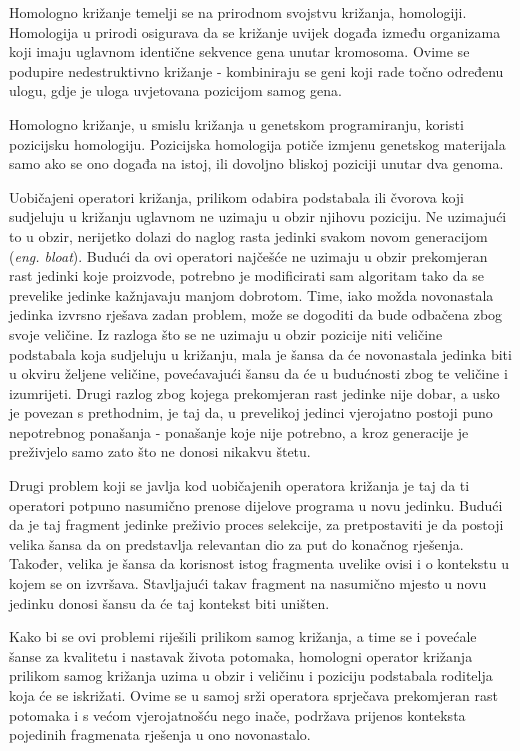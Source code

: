 Homologno križanje \cite{crxSizeFair} temelji se na prirodnom svojstvu križanja, homologiji. Homologija u prirodi osigurava da se križanje uvijek događa između organizama koji imaju uglavnom identične sekvence gena unutar kromosoma. Ovime se podupire nedestruktivno križanje - kombiniraju se geni koji rade točno određenu ulogu, gdje je uloga uvjetovana pozicijom samog gena.

Homologno križanje, u smislu križanja u genetskom programiranju, koristi pozicijsku homologiju. Pozicijska homologija potiče izmjenu genetskog materijala samo ako se ono događa na istoj, ili dovoljno bliskoj poziciji unutar dva genoma.

Uobičajeni operatori križanja, prilikom odabira podstabala ili čvorova koji sudjeluju u križanju uglavnom ne uzimaju u obzir njihovu poziciju. Ne uzimajući to u obzir, nerijetko dolazi do naglog rasta jedinki svakom novom generacijom (\textit{eng. bloat}). Budući da ovi operatori najčešće ne uzimaju u obzir prekomjeran rast jedinki koje proizvode, potrebno je modificirati sam algoritam tako da se prevelike jedinke kažnjavaju manjom dobrotom. Time, iako možda novonastala jedinka izvrsno rješava zadan problem, može se dogoditi da bude odbačena zbog svoje veličine. Iz razloga što se ne uzimaju u obzir pozicije niti veličine podstabala koja sudjeluju u križanju, mala je šansa da će novonastala jedinka biti u okviru željene veličine, povećavajući šansu da će u budućnosti zbog te veličine i izumrijeti. Drugi razlog zbog kojega prekomjeran rast jedinke nije dobar, a usko je povezan s prethodnim, je taj da, u prevelikoj jedinci vjerojatno postoji puno nepotrebnog ponašanja - ponašanje koje nije potrebno, a kroz generacije je preživjelo samo zato što ne donosi nikakvu štetu.

Drugi problem koji se javlja kod uobičajenih operatora križanja je taj da ti operatori potpuno nasumično prenose dijelove programa u novu jedinku. Budući da je taj fragment jedinke preživio proces selekcije, za pretpostaviti je da postoji velika šansa da on predstavlja relevantan dio za put do konačnog rješenja. Također, velika je šansa da korisnost istog fragmenta uvelike ovisi i o kontekstu u kojem se on izvršava. Stavljajući takav fragment na nasumično mjesto u novu jedinku donosi šansu da će taj kontekst biti uništen.

Kako bi se ovi problemi riješili prilikom samog križanja, a time se i povećale šanse za kvalitetu i nastavak života potomaka, homologni operator križanja prilikom samog križanja uzima u obzir i veličinu i poziciju podstabala roditelja koja će se iskrižati. Ovime se u samoj srži operatora sprječava prekomjeran rast potomaka i s većom vjerojatnošću nego inače, podržava prijenos konteksta pojedinih fragmenata rješenja u ono novonastalo.

